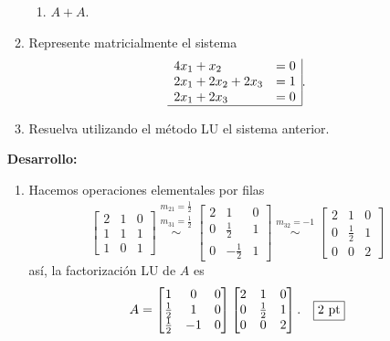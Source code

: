 \documentclass[11pt]{article}
\begin{document}
\begin{enumerate}
\begin{enumerate}
\begin{multicols}{3}
\begin{enumerate}
\item $A+A$.
\end{enumerate}
\end{multicols}
\item Represente matricialmente el sistema
$$
\begin{array}{ll|}
4x_1+x_2		&=0\\
2x_1+2x_2+2x_3	&=1 \\
2x_1+2x_3		&=0 \\
\hline
\end{array}.
$$
\item Resuelva utilizando el m\'etodo LU el sistema anterior.
\end{enumerate}
\textbf{Desarrollo:}
\begin{enumerate}
\item Hacemos operaciones elementales por filas
$$
 \begin{bmatrix}
2 & 1 & 0 \\
1 & 1 & 1 \\
1 & 0 & 1
\end{bmatrix}
	 \stackrel{\begin{array}{c}
     m_{21}=\frac{1}{2}\\m_{31}=\frac{1}{2}
     			\end{array}
     			}{\sim}
     		 \begin{bmatrix}
              2 & 1 			& 0		\\
              0 & \frac{1}{2}  	& 1 	\\
              0 & -\frac{1}{2} 	& 1
              \end{bmatrix}
   	\stackrel{\begin{array}{c}
     m_{32}=-1
     			\end{array}
     			}{\sim}
              \begin{bmatrix}
              2 & 1 			& 0		\\
              0 & \frac{1}{2}  	& 1 	\\
              0 & 0 			& 2
              \end{bmatrix}
$$
as\'i, la factorizaci\'on LU de $A$ es
$$
A=\begin{bmatrix}
1 & 0 & 0 \\
\frac{1}{2} & 1 & 0 \\
\frac{1}{2} & -1 & 0 \\
\end{bmatrix}
              \begin{bmatrix}
              2 & 1 			& 0		\\
              0 & \frac{1}{2}  	& 1 	\\
              0 & 0 			& 2
              \end{bmatrix}. \quad \fbox{2 pt}
$$


\end{enumerate}
\end{enumerate}
\end{document}
